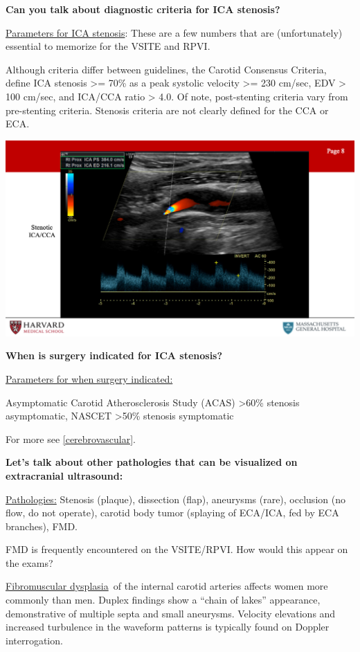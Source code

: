 \documentclass[
]{book}
\begin{document}
\textbf{Can you talk about diagnostic criteria for ICA stenosis?}

\uline{Parameters for ICA stenosis}: These are a few numbers that
are (unfortunately) essential to memorize for the VSITE and RPVI.

Although criteria differ between guidelines, the Carotid Consensus
Criteria, define ICA stenosis \textgreater= 70\% as a peak systolic velocity \textgreater=
230 cm/sec, EDV \textgreater{} 100 cm/sec, and ICA/CCA ratio \textgreater{} 4.0. Of note,
post-stenting criteria vary from pre-stenting criteria. Stenosis
criteria are not clearly defined for the CCA or ECA.

\includegraphics[width=15.01in]{images/vasc_lab2/Slide9}

\textbf{When is surgery indicated for ICA stenosis?}

\uline{Parameters for when surgery indicated:}

Asymptomatic Carotid Atherosclerosis Study (ACAS) \textgreater60\% stenosis
asymptomatic, NASCET \textgreater50\% stenosis symptomatic

For more see \ref{cerebrovascular}.

\textbf{Let's talk about other pathologies that can be visualized on
extracranial ultrasound:}

\uline{Pathologies:} Stenosis (plaque), dissection (flap),
aneurysms (rare), occlusion (no flow, do not operate), carotid body
tumor (splaying of ECA/ICA, fed by ECA branches), FMD.

FMD is frequently encountered on the VSITE/RPVI. How would this appear
on the exams?

\uline{Fibromuscular dysplasia}~of the internal carotid arteries
affects women more commonly than men. Duplex findings show a ``chain of
lakes'' appearance, demonstrative of multiple septa and small aneurysms.
Velocity elevations and increased turbulence in the waveform patterns is
typically found on Doppler interrogation.\citep{olin2012}
\end{document}

